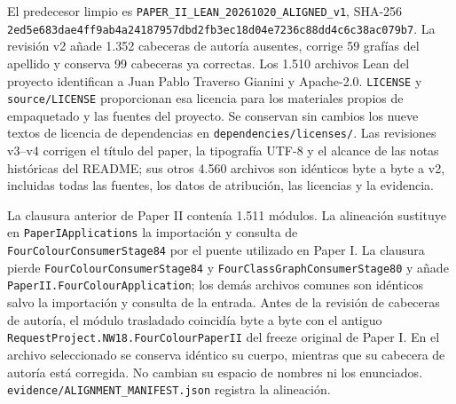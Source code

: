 \documentclass[spanish,11pt,a4paper]{article}
\begin{document}
El predecesor limpio es \texttt{PAPER\_\allowbreak{}II\_\allowbreak{}LEA\allowbreak{}N\_\allowbreak{}20261020\_\allowbreak{}A\allowbreak{}LIGNED\_\allowbreak{}v1}, SHA-256 \texttt{2ed5e683\allowbreak{}dae4\allowbreak{}ff9a\allowbreak{}b4a24187\allowbreak{}\allowbreak{}957dbd2f\allowbreak{}b3ec\allowbreak{}18d0\allowbreak{}4e7236c8\allowbreak{}\allowbreak{}8dd4c6c3\allowbreak{}8ac0\allowbreak{}79b7\allowbreak{}}. La revisión v2 añade 1.352 cabeceras de autoría ausentes, corrige 59 grafías del apellido y conserva 99 cabeceras ya correctas. Los 1.510 archivos Lean del proyecto identifican a Juan Pablo Traverso Gianini y Apache-2.0. \texttt{LICENSE} y \texttt{source/\allowbreak{}LICEN\allowbreak{}SE} proporcionan esa licencia para los materiales propios de empaquetado y las fuentes del proyecto. Se conservan sin cambios los nueve textos de licencia de dependencias en \texttt{dependencies\allowbreak{}/\allowbreak{}licenses/\allowbreak{}}. Las revisiones v3--v4 corrigen el título del paper, la tipografía UTF-8 y el alcance de las notas históricas del README; sus otros 4.560 archivos son idénticos byte a byte a v2, incluidas todas las fuentes, los datos de atribución, las licencias y la evidencia.

La clausura anterior de Paper II contenía 1.511 módulos. La alineación sustituye en \texttt{Paper\allowbreak{}IApplic\allowbreak{}ations} la importación y consulta de \texttt{Four\allowbreak{}Colour\allowbreak{}Co\allowbreak{}nsumer\allowbreak{}Stage8\allowbreak{}4} por el puente utilizado en Paper I. La clausura pierde \texttt{Four\allowbreak{}Colour\allowbreak{}Co\allowbreak{}nsumer\allowbreak{}Stage8\allowbreak{}4} y \texttt{Four\allowbreak{}Class\allowbreak{}Gra\allowbreak{}ph\allowbreak{}Consumer\allowbreak{}St\allowbreak{}age80} y añade \texttt{Paper\allowbreak{}II.\allowbreak{}Four\allowbreak{}\allowbreak{}Colour\allowbreak{}Applic\allowbreak{}ation}; los demás archivos comunes son idénticos salvo la importación y consulta de la entrada. Antes de la revisión de cabeceras de autoría, el módulo trasladado coincidía byte a byte con el antiguo \texttt{Request\allowbreak{}Proje\allowbreak{}ct.\allowbreak{}NW18.\allowbreak{}Four\allowbreak{}\allowbreak{}Colour\allowbreak{}Paper\allowbreak{}I\allowbreak{}I} del freeze original de Paper I. En el archivo seleccionado se conserva idéntico su cuerpo, mientras que su cabecera de autoría está corregida. No cambian su espacio de nombres ni los enunciados. \texttt{evidence/\allowbreak{}ALI\allowbreak{}GNMENT\_\allowbreak{}MANIF\allowbreak{}EST.\allowbreak{}json} registra la alineación.
\end{document}
